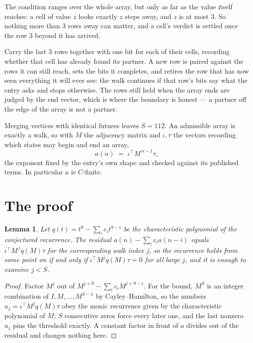 \documentclass[11pt,a4paper]{article}
\theoremstyle{plain}
\newtheorem{lemma}[theorem]{Lemma}
\theoremstyle{definition}
\begin{document}
The condition ranges over the whole array, but only as far as the value itself reaches: a cell of value $z$ looks exactly $z$ steps away, and $z$ is at most $3$. So nothing more than $3$ rows away can matter, and a cell's verdict is settled once the row $3$ beyond it has arrived.

Carry the last $3$ rows together with one bit for each of their cells, recording whether that cell has already found its partner. A new row is paired against the rows it can still reach, sets the bits it completes, and retires the row that has now seen everything it will ever see: the walk continues if that row's bits say what the entry asks and stops otherwise. The rows still held when the array ends are judged by the end vector, which is where the boundary is honest --- a partner off the edge of the array is not a partner.

Merging vertices with identical futures leaves $S=112$. An admissible array is exactly a walk, so with $M$ the adjacency matrix and $\iota,\tau$ the vectors recording which states may begin and end an array,
\[
a(n)\;=\;\iota^{\!\top}M^{\,n-1}\tau ,
\]
the exponent fixed by the entry's own shape and checked against its published terms. In
particular $a$ is $C$-finite.

\section{The proof}

\begin{lemma}\label{lem:crit}
Let $q(t)=t^{9}-\sum_i c_it^{9-i}$ be the characteristic polynomial of the
conjectured recurrence. The residual $a(n)-\sum_ic_ia(n-i)$ equals
$\iota^{\!\top}M^{\,j}q(M)\tau$ for the corresponding walk index $j$, so the recurrence
holds from some point on if and only if $\iota^{\!\top}M^{j}q(M)\tau=0$ for all large $j$,
and it is enough to examine $j<S$.
\end{lemma}

\begin{proof}
Factor $M^{j}$ out of $M^{j+9}-\sum_ic_iM^{j+9-i}$. For the bound, $M^{S}$
is an integer combination of $I,M,\dots,M^{S-1}$ by Cayley--Hamilton, so the numbers
$u_j=\iota^{\!\top}M^{j}q(M)\tau$ obey the monic recurrence given by the characteristic
polynomial of $M$; $S$ consecutive zeros force every later one, and the last nonzero $u_j$
pins the threshold exactly. A constant factor in front of $a$ divides out of the residual and
changes nothing here.
\end{proof}
\end{document}

